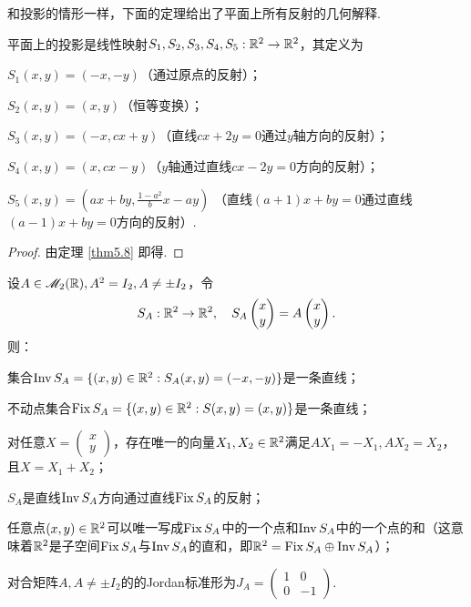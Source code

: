 和投影的情形一样，下面的定理给出了平面上所有反射的几何解释.
\begin{mybox}
  \begin{theorem}[平面的反射.]

   平面上的投影是线性映射$S_1,S_2,S_3,S_4,S_5:\mathbb R^2\to\mathbb R^2$，其定义为
   \begin{enum}
     \item $S_1(x,y)=(-x,-y)$（通过原点的反射）；
     \item $S_2(x,y)=(x,y)$（恒等变换）；
     \item $S_3(x,y)=(-x,cx+y)$（直线$cx+2y=0$通过$y$轴方向的反射）；
     \item $S_4(x,y)=(x,cx-y)$（$y$轴通过直线$cx-2y=0$方向的反射）；
     \item $S_5(x,y)=\left(ax+by,\frac{1-a^2}bx-ay\right)$
         （直线$(a+1)x+by=0$通过直线$(a-1)x+by=0$方向的反射）.
   \end{enum}
  \end{theorem}
\end{mybox}
\begin{proof}
  由定理 \ref{thm5.8} 即得.
\end{proof}

\begin{mybox}
  \begin{theorem}[反射的基本性质.]

    设$A\in\mathscr M_2(\mathbb R),A^2=I_2,A\ne\pm I_2$，令
    \[
      S_A:\mathbb R^2 \to \mathbb R^2 ,\quad S_A\begin{pmatrix}
        x \\
        y
      \end{pmatrix} = A\begin{pmatrix}
        x \\
        y
      \end{pmatrix}.
    \]
    则：
    \begin{enum}
      \item 集合$\operatorname{Inv} S_A=\{(x,y)\in\mathbb R^2:S_A(x,y)=(-x,-y)\}$是一条直线；
      \item 不动点集合$\operatorname{Fix} S_A=\{(x,y)\in\mathbb R^2:S(x,y)=(x,y)\}$是一条直线；
      \item 对任意$X=\begin{pmatrix}
        x\\
        y
      \end{pmatrix}$，存在唯一的向量$X_1,X_2\in\mathbb R^2$满足$AX_1=-X_1,AX_2=X_2$，且$X=X_1+X_2$；
      \item $S_A$是直线$\operatorname{Inv} S_A$方向通过直线$\operatorname{Fix} S_A$的反射；
      \item 任意点$(x,y)\in\mathbb R^2$可以唯一写成$\operatorname{Fix} S_A$中的一个点和$\operatorname{Inv} S_A$中的一个点的和（这意味着$\mathbb R^2$是子空间$\operatorname{Fix} S_A$与$\operatorname{Inv} S_A$的直和，即$\mathbb R^2=\operatorname{Fix} S_A\oplus \operatorname{Inv} S_A$）；
      \item 对合矩阵$A,A\ne\pm I_2$的的Jordan标准形为$J_A=\begin{pmatrix}
            1 & 0 \\
            0 & -1
          \end{pmatrix}$.
    \end{enum}
  \end{theorem}
\end{mybox}

